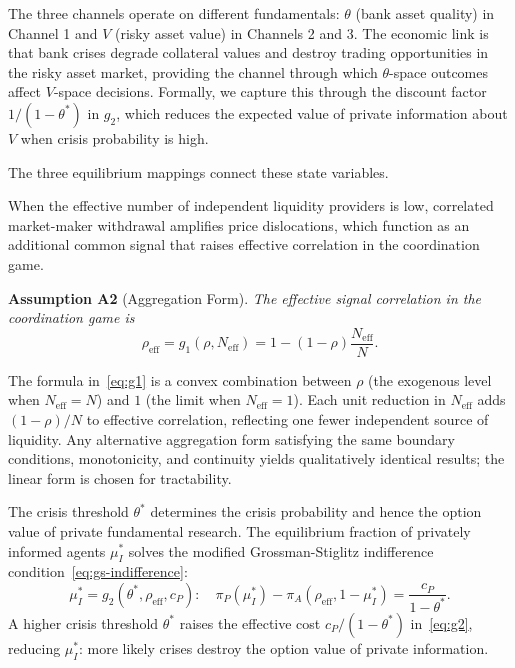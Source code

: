 The three channels operate on different fundamentals: $\theta$ (bank asset quality) in Channel 1 and $V$ (risky asset value) in Channels 2 and 3. The economic link is that bank crises degrade collateral values and destroy trading opportunities in the risky asset market, providing the channel through which $\theta$-space outcomes affect $V$-space decisions. Formally, we capture this through the discount factor $1/(1-\theta^*)$ in $g_2$, which reduces the expected value of private information about $V$ when crisis probability is high.

The three equilibrium mappings connect these state variables.

 When the effective number of independent liquidity providers is low, correlated market-maker withdrawal amplifies price dislocations, which function as an additional common signal that raises effective correlation in the coordination game.

\medskip\noindent\textbf{Assumption A2} (Aggregation Form).\label{ass:g1}
\emph{The effective signal correlation in the coordination game is}
\begin{equation}\label{eq:g1}
  \rho_{\text{eff}} = g_1(\rho, N_{\text{eff}}) = 1 - (1-\rho)\frac{N_{\text{eff}}}{N}.
\end{equation}

\noindent The formula in~\eqref{eq:g1} is a convex combination between $\rho$ (the exogenous level when $N_{\text{eff}} = N$) and $1$ (the limit when $N_{\text{eff}} = 1$). Each unit reduction in $N_{\text{eff}}$ adds $(1-\rho)/N$ to effective correlation, reflecting one fewer independent source of liquidity. Any alternative aggregation form satisfying the same boundary conditions, monotonicity, and continuity yields qualitatively identical results; the linear form is chosen for tractability.

 The crisis threshold $\theta^*$ determines the crisis probability and hence the option value of private fundamental research. The equilibrium fraction of privately informed agents $\mu_I^*$ solves the modified Grossman-Stiglitz indifference condition~\eqref{eq:gs-indifference}:
\begin{equation}\label{eq:g2}
  \mu_I^* = g_2(\theta^*, \rho_{\text{eff}}, c_P): \quad \pi_P(\mu_I^*) - \pi_A(\rho_{\text{eff}}, 1-\mu_I^*) = \frac{c_P}{1-\theta^*}.
\end{equation}
A higher crisis threshold $\theta^*$ raises the effective cost $c_P/(1-\theta^*)$ in~\eqref{eq:g2}, reducing $\mu_I^*$: more likely crises destroy the option value of private information.

